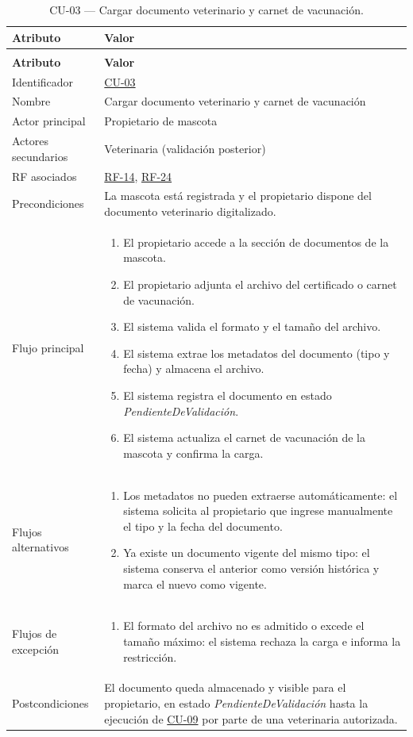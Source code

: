 \documentclass[journal,onecolumn]{IEEEtran}
\makeatletter
\newenvironment{atributos}[2]{%
	\small
	\begin{longtable}{@{}>{\raggedright\arraybackslash}p{4.2cm} >{\raggedright\arraybackslash}p{11.2cm}@{}}
		\caption{#2}\label{tab:#1}\\
		\toprule
		\textbf{Atributo} & \textbf{Valor} \\
		\midrule
		\endfirsthead
		\multicolumn{2}{@{}l}{\small\itshape (continuación)}\\
		\toprule
		\textbf{Atributo} & \textbf{Valor} \\
		\midrule
		\endhead
		\bottomrule
		\endlastfoot
	}{%
	\end{longtable}
	\normalsize
}
\makeatother
\begin{document}
	\begin{atributos}{CU-03}{CU-03 --- Cargar documento veterinario y carnet de vacunación.}
		Identificador & \hyperref[tab:CU-03]{CU-03} \\
		Nombre & Cargar documento veterinario y carnet de vacunación \\
		Actor principal & Propietario de mascota \\
		Actores secundarios & Veterinaria (validación posterior) \\
		RF asociados & \hyperref[tab:RF-14]{RF-14}, \hyperref[tab:RF-24]{RF-24} \\
		Precondiciones & La mascota está registrada y el propietario dispone del documento veterinario digitalizado. \\
		Flujo principal &
		\begin{enumerate}[leftmargin=*, nosep]
			\item El propietario accede a la sección de documentos de la mascota.
			\item El propietario adjunta el archivo del certificado o carnet de vacunación.
			\item El sistema valida el formato y el tamaño del archivo.
			\item El sistema extrae los metadatos del documento (tipo y fecha) y almacena el archivo.
			\item El sistema registra el documento en estado \emph{PendienteDeValidación}.
			\item El sistema actualiza el carnet de vacunación de la mascota y confirma la carga.
		\end{enumerate} \\
		Flujos alternativos &
		\begin{enumerate}[leftmargin=*, nosep]
			\item[4.1] Los metadatos no pueden extraerse automáticamente: el sistema solicita al propietario que ingrese manualmente el tipo y la fecha del documento.
			\item[6.1] Ya existe un documento vigente del mismo tipo: el sistema conserva el anterior como versión histórica y marca el nuevo como vigente.
		\end{enumerate} \\
		Flujos de excepción &
		\begin{enumerate}[leftmargin=*, nosep]
			\item[3.1] El formato del archivo no es admitido o excede el tamaño máximo: el sistema rechaza la carga e informa la restricción.
		\end{enumerate} \\
		Postcondiciones & El documento queda almacenado y visible para el propietario, en estado \emph{PendienteDeValidación} hasta la ejecución de \hyperref[tab:CU-09]{CU-09} por parte de una veterinaria autorizada. \\
	\end{atributos}
	
\end{document}
